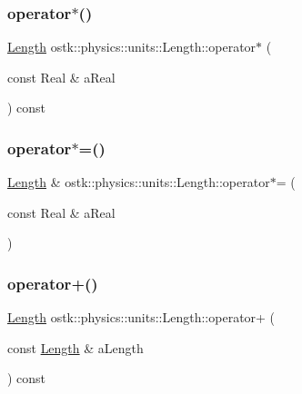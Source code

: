 \mbox{\label{classostk_1_1physics_1_1units_1_1_length_a58a2e430e8a6296e7eca6e5307d5805d}} 
\subsubsection{\texorpdfstring{operator$\ast$()}{operator*()}}
{\footnotesize\ttfamily \hyperlink{classostk_1_1physics_1_1units_1_1_length}{Length} ostk\+::physics\+::units\+::\+Length\+::operator$\ast$ (\begin{DoxyParamCaption}\item[{const Real \&}]{a\+Real }\end{DoxyParamCaption}) const}

\mbox{\label{classostk_1_1physics_1_1units_1_1_length_a6cb940402ce088d7b349bf4f4ca57cdf}} 
\subsubsection{\texorpdfstring{operator$\ast$=()}{operator*=()}}
{\footnotesize\ttfamily \hyperlink{classostk_1_1physics_1_1units_1_1_length}{Length} \& ostk\+::physics\+::units\+::\+Length\+::operator$\ast$= (\begin{DoxyParamCaption}\item[{const Real \&}]{a\+Real }\end{DoxyParamCaption})}

\mbox{\label{classostk_1_1physics_1_1units_1_1_length_a75f9cc6530d47b20f5f0204f452b21ff}} 
\subsubsection{\texorpdfstring{operator+()}{operator+()}}
{\footnotesize\ttfamily \hyperlink{classostk_1_1physics_1_1units_1_1_length}{Length} ostk\+::physics\+::units\+::\+Length\+::operator+ (\begin{DoxyParamCaption}\item[{const \hyperlink{classostk_1_1physics_1_1units_1_1_length}{Length} \&}]{a\+Length }\end{DoxyParamCaption}) const}

